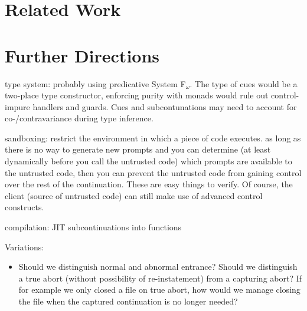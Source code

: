 \documentclass[11pt]{article}
\newcommand{\maybePage}{\newpage}
\begin{document}
\section{Related Work}

\section{Further Directions}

type system: probably using predicative System F$_\omega$. The type of cues would be a two-place type constructor, enforcing purity with monads would rule out control-impure handlers and guards. Cues and subcontunations may need to account for co-/contravariance during type inference.

sandboxing: restrict the environment in which a piece of code executes. as long as there is no way to generate new prompts and you can determine (at least dynamically before you call the untrusted code) which prompts are available to the untrusted code, then you can prevent the untrusted code from gaining control over the rest of the continuation. These are easy things to verify. Of course, the client (source of untrusted code) can still make use of advanced control constructs.

compilation: JIT subcontinuations into functions

Variations:
\begin{itemize}
\item Should we distinguish normal and abnormal entrance? Should we distinguish a true abort (without possibility of re-instatement) from a capturing abort? If for example we only closed a file on true abort, how would we manage closing the file when the captured continuation is no longer needed?
\end{itemize}





\maybePage


\end{document}
